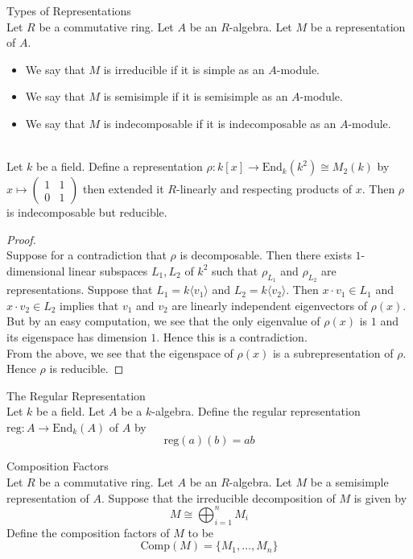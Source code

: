 \documentclass[a4paper]{article}
\begin{document}
\begin{defn}{Types of Representations}{}\\
Let $R$ be a commutative ring. Let $A$ be an $R$-algebra. Let $M$ be a representation of $A$. 
\begin{itemize}
\item We say that $M$ is irreducible if it is simple as an $A$-module. 
\item We say that $M$ is semisimple if it is semisimple as an $A$-module. 
\item We say that $M$ is indecomposable if it is indecomposable as an $A$-module. 
\end{itemize}
\end{defn}

\begin{eg}{}{}\\
Let $k$ be a field. Define a representation $\rho:k[x]\to\text{End}_k(k^2)\cong M_2(k)$ by $x\mapsto\begin{pmatrix}
1 & 1\\
0 & 1
\end{pmatrix}$ then extended it $R$-linearly and respecting products of $x$. Then $\rho$ is indecomposable but reducible. 
\begin{proof}\\
Suppose for a contradiction that $\rho$ is decomposable. Then there exists $1$-dimensional linear subspaces $L_1,L_2$ of $k^2$ such that $\rho_{L_1}$ and $\rho_{L_2}$ are representations. Suppose that $L_1=k\langle v_1\rangle$ and $L_2=k\langle v_2\rangle$. Then $x\cdot v_1\in L_1$ and $x\cdot v_2\in L_2$ implies that $v_1$ and $v_2$ are linearly independent eigenvectors of $\rho(x)$. But by an easy computation, we see that the only eigenvalue of $\rho(x)$ is $1$ and its eigenspace has dimension $1$. Hence this is a contradiction. \\

From the above, we see that the eigenspace of $\rho(x)$ is a subrepresentation of $\rho$. Hence $\rho$ is reducible. 
\end{proof}
\end{eg}

\begin{defn}{The Regular Representation}{}\\
Let $k$ be a field. Let $A$ be a $k$-algebra. Define the regular representation $\text{reg}:A\to\text{End}_k(A)$ of $A$ by $$\text{reg}(a)(b)=ab$$
\end{defn}

\begin{defn}{Composition Factors}{}\\
Let $R$ be a commutative ring. Let $A$ be an $R$-algebra. Let $M$ be a semisimple representation of $A$. Suppose that the irreducible decomposition of $M$ is given by $$M\cong\bigoplus_{i=1}^nM_i$$ Define the composition factors of $M$ to be $$\text{Comp}(M)=\{M_1,\dots,M_n\}$$
\end{defn}
\end{document}

